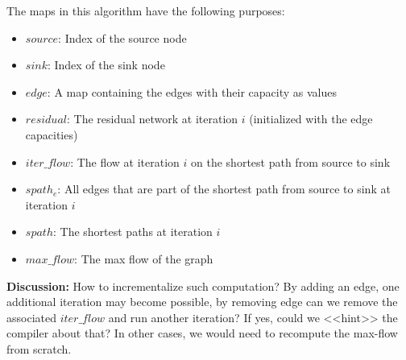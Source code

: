\documentclass[10pt]{article}
\newlength{\dlen}
\def\discuss#1{\par\hspace{2em}
\setlength{\dlen}{\textwidth}
\addtolength{\dlen}{-2em}
\begin{minipage}{\dlen}\footnotesize {\bf\color{red} Discussion:} #1\end{minipage}\par}
\begin{document}
The maps in this algorithm have the following purposes:
\begin{itemize}
\item $source$: Index of the source node
\item $sink$: Index of the sink node
\item $edge$: A map containing the edges with their capacity as values
\item $residual$: The residual network at iteration $i$ (initialized with the edge capacities)
\item $iter\_flow$: The flow at iteration $i$ on the shortest path from source to sink
\item $spath_e$: All edges that are part of the shortest path from source to sink at iteration $i$
\item $spath$: The shortest paths at iteration $i$
\item $max\_flow$: The max flow of the graph 
\end{itemize}
\discuss{
How to incrementalize such computation? By adding an edge, one additional iteration may become possible, by removing edge can we remove the associated $iter\_flow$ and run another iteration? If yes, could we <<hint>> the compiler about that? In other cases, we would need to recompute the max-flow from scratch.
}

\end{document}

